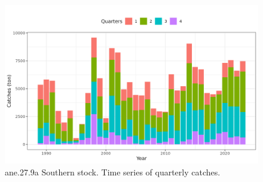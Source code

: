 \documentclass[
]{article}
\begin{document}
\begin{figure}[H]

{\centering \includegraphics[width=0.95\linewidth]{report/run/S1.0_4FLEETS_SelECO_RecIndex_Mnewfix/fig_catches} 

}

\caption{ane.27.9a Southern stock. Time series of quarterly catches.}\label{fig:unnamed-chunk-29}
\end{figure}
\end{document}
